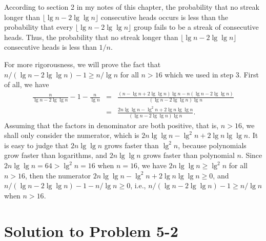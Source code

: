 \documentclass[a4paper, fleqn]{article}
\begin{document}
According to section 2 in my notes of this chapter, the probability that no 
streak longer than $\lfloor \lg n - 2\lg\lg n \rfloor$ consecutive heads occurs 
is less than the probability that every $\lfloor \lg n - 2\lg\lg n \rfloor$ 
group fails to be a streak of consecutive heads. Thus, the probability that no 
streak longer than $\lfloor \lg n - 2\lg\lg n \rfloor$ consecutive heads is less 
than $1/n$.

For more rigorousness, we will prove the fact that $n / (\lg n - 2\lg\lg n ) - 
1 \geq n / \lg n$ for all $n > 16$ which we used in step 3. First of all, we have
\begin{eqnarray*}
\frac{n}{\lg n - 2\lg\lg n} - 1 - \frac{n}{\lg n}
& = & \frac{(n - \lg n + 2\lg\lg n)\lg n - n (\lg n - 2\lg\lg n)}{(\lg n - 2\lg\lg n)\lg n} \\
& = & \frac{2n\lg\lg n - \lg^2 n + 2\lg n\lg\lg n}{(\lg n - 2\lg\lg n)\lg n}.
\end{eqnarray*}
Assuming that the factors in denominator are both positive, that is, $n > 16$, 
we shall only consider the numerator, which is $2n\lg\lg n - \lg^2 n + 2\lg n
\lg\lg n$. It is easy to judge that $2n\lg\lg n$ grows faster than $\lg^2 n$, because polynomials grow faster than logarithms, and $2n\lg\lg n$ grows faster 
than polynomial $n$. Since $2n\lg\lg n = 64 > \lg^2 n = 16$ when $n = 16$, we 
have $2n\lg\lg n \geq \lg^2 n$ for all $n > 16$, then the numerator $2n\lg\lg n 
- \lg^2 n + 2\lg n\lg\lg n \geq 0$, and $n / (\lg n - 2\lg\lg n ) - 1 - n / 
\lg n \geq 0$, i.e., $n / (\lg n - 2\lg\lg n ) - 1 \geq n / \lg n$ when $n > 16$.







\section*{Solution to Problem 5-2}
\end{document}

